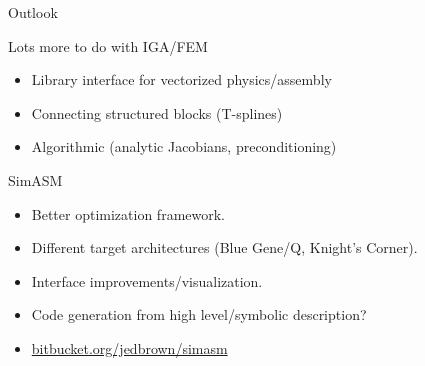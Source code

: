 \documentclass{beamer}
\begin{document}
\begin{frame}{Outlook}
  \begin{block}{Lots more to do with IGA/FEM}
    \begin{itemize}
    \item Library interface for vectorized physics/assembly
    \item Connecting structured blocks (T-splines)
    \item Algorithmic (analytic Jacobians, preconditioning)
    \end{itemize}
  \end{block}
  \begin{block}{SimASM}
    \begin{itemize}
    \item Better optimization framework.
    \item Different target architectures (\eg Blue Gene/Q, Knight's Corner).
    \item Interface improvements/visualization.
    \item Code generation from high level/symbolic description?
    \item \url{bitbucket.org/jedbrown/simasm}
    \end{itemize}
  \end{block}
\end{frame}
\end{document}
